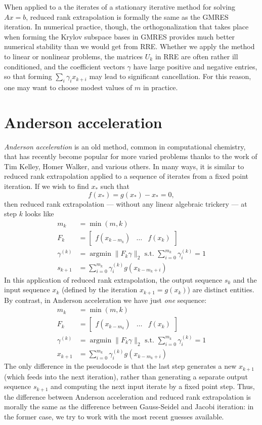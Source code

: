 \documentclass[12pt, leqno]{article} %
\begin{document}
When applied to a the iterates of a stationary iterative method for
solving $Ax = b$, reduced rank extrapolation is formally the same as
the GMRES iteration.  In numerical practice, though, the
orthogonalization that takes place when forming the Krylov subspace
bases in GMRES provides much better numerical stability than we would
get from RRE.  Whether we apply the method to linear or nonlinear
problems, the matrices $U_k$ in RRE are often rather ill conditioned,
and the coefficient vectors $\gamma$ have large positive and negative
entries, so that forming $\sum_i \gamma_i x_{k+i}$ may lead to
significant cancellation.  For this reason, one may want to choose
modest values of $m$ in practice.

\section{Anderson acceleration}

{\em Anderson acceleration} is an old method, common in computational
chemistry, that has recently become popular for more varied problems
thanks to the work of Tim Kelley, Homer Walker, and various others.
In many ways, it is similar to reduced rank extrapolation applied to
a sequence of iterates from a fixed point iteration.  If we wish to
find $x_*$ such that
\[
  f(x_*) = g(x_*) - x_* = 0,
\]
then reduced rank extrapolation --- without any linear algebraic
trickery --- at step $k$ looks like
\begin{align*}
  m_k & = \min(m,k) \\
  F_k &= \begin{bmatrix} f(x_{k-m_k}) & \ldots & f(x_k) \end{bmatrix} \\
  \gamma^{(k)} &= \operatorname{argmin} \|F_k \gamma\|_2 \mbox{ s.t. }
  \sum_{i=0}^{m_k} \gamma_i^{(k)} = 1 \\
  s_{k+1} &= \sum_{i=0}^{m_k} \gamma_i^{(k)} g(x_{k-m_k+i})
\end{align*}
In this application of reduced rank extrapolation, the output sequence
$s_k$ and the input sequence $x_k$ (defined by the iteration
$x_{k+1} = g(x_k)$) are distinct entities.  By contrast, in Anderson
acceleration we have just {\em one} sequence:
\begin{align*}
  m_k & = \min(m,k) \\
  F_k &= \begin{bmatrix} f(x_{k-m_k}) & \ldots & f(x_k) \end{bmatrix} \\
  \gamma^{(k)} &= \operatorname{argmin} \|F_k \gamma\|_2 \mbox{ s.t. }
  \sum_{i=0}^{m_k} \gamma_i^{(k)} = 1 \\
  x_{k+1} &= \sum_{i=0}^{m_k} \gamma_i^{(k)} g(x_{k-m_k+i})
\end{align*}
The only difference in the pseudocode is that the last step generates
a new $x_{k+1}$ (which feeds into the next iteration), rather than
generating a separate output sequence $s_{k+1}$ and computing the next
input iterate by a fixed point step.
Thus, the difference between Anderson acceleration and reduced rank
extrapolation is morally the same as the difference between
Gauss-Seidel and Jacobi iteration: in the former case, we try to work
with the most recent guesses available.
\end{document}
